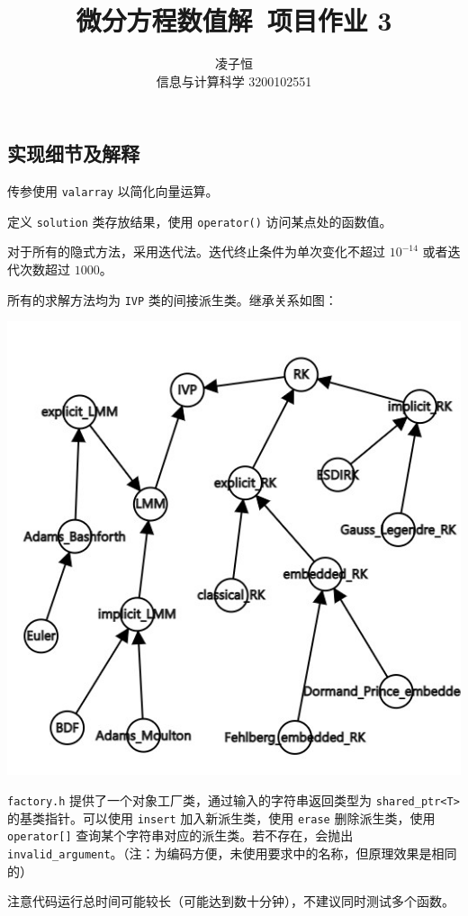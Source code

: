 \documentclass[12pt]{ctexart}
\title{微分方程数值解~项目作业 3}
\author{凌子恒 \\ 信息与计算科学 3200102551}
\begin{document}
\maketitle

\subsection*{实现细节及解释}

传参使用 \texttt{valarray} 以简化向量运算。

定义 \texttt{solution} 类存放结果，使用 \texttt{operator()} 访问某点处的函数值。

对于所有的隐式方法，采用迭代法。迭代终止条件为单次变化不超过 $10^{-14}$ 或者迭代次数超过 $1000$。 

所有的求解方法均为 \texttt{IVP} 类的间接派生类。继承关系如图：

\includegraphics[scale=0.8]{1.jpg}

\texttt{factory.h} 提供了一个对象工厂类，通过输入的字符串返回类型为 \texttt{shared\_ptr<T>} 的基类指针。可以使用 \texttt{insert} 加入新派生类，使用 \texttt{erase} 删除派生类，使用 \texttt{operator[]} 查询某个字符串对应的派生类。若不存在，会抛出 \texttt{invalid\_argument}。（注：为编码方便，未使用要求中的名称，但原理效果是相同的）

注意代码运行总时间可能较长（可能达到数十分钟），不建议同时测试多个函数。
\end{document}
